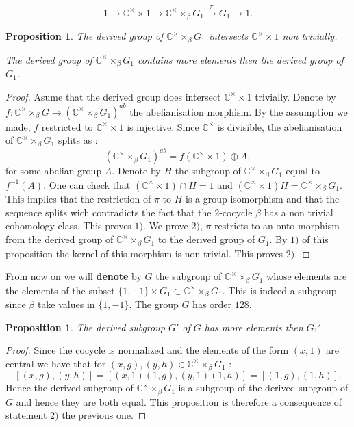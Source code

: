 \documentclass[12pt, reqno]{amsart}
\newtheorem{proposition}[theorem]{Proposition}
\begin{document}
$$1\to \mathbb{C}^\times\times 1 \to \mathbb{C}^\times \times_\beta G_1 \overset{\pi}{\to} G_1\to 1.$$
\begin{proposition}
\item[1)] The derived group of  $\mathbb{C}^\times \times_\beta G_1$ intersects $\mathbb{C}^\times \times 1$ non trivially. 
\item[2)] The derived group of $\mathbb{C}^\times \times_\beta G_1$ contains more elements then the derived group of $G_1$.
\end{proposition}
\begin{proof}
Asume that the derived group does intersect $\mathbb{C}^\times \times 1$ trivially. Denote by $f:  \mathbb{C}^\times \times_\beta G \to  (\mathbb{C}^\times \times_\beta G_1 )^{ab}$ the abelianisation morphism. By the assumption we made, $f$ restricted to $\mathbb{C}^\times \times 1$ is injective. Since $\mathbb{C}^\times$ is divisible, the abelianisation of $ \mathbb{C}^\times \times_\beta G_1 $ splits as :
$$( \mathbb{C}^\times \times_\beta G_1 )^{ab}=f(\mathbb{C}^\times \times 1 )\oplus A,$$
for some abelian group $A$. Denote by $H$ the subgroup of $ \mathbb{C}^\times \times_\beta G_1 $ equal to $f^{-1}(A)$. One can check that $(\mathbb{C}^\times \times 1)\cap H=1$ and $(\mathbb{C}^\times \times 1)H= \mathbb{C}^\times \times_\beta G_1 $. This implies that the restriction of $\pi$ to $H$ is a group isomorphism and that the sequence splits wich contradicts the fact that the $2$-cocycle $\beta$ has a non trivial cohomology class. This proves $1)$. We prove $2)$, $\pi$ restricts to an onto morphism from the derived group of $\mathbb{C}^\times \times_\beta G_1$ to the derived group of $G_1$. By $1)$ of this proposition the kernel of this morphism is non trivial. This proves $2)$. 
\end{proof}
From now on we will \textbf{denote} by $G$ the subgroup of $\mathbb{C}^\times \times_\beta G_1$ whose elements are the elements of the subset $\{1,-1\}\times G_1 \subset \mathbb{C}^\times \times_\beta G_1$. This is indeed a subgroup since $\beta$ take values in $\{1,-1\}$. The group $G$ has order $128$.
\begin{proposition}
The derived subgroup $G'$ of $G$ has more elements then $G_1'$.
\end{proposition}
 \begin{proof}
Since the cocycle is normalized and the elements of the form $(x,1)$ are central we have that for $(x,g),(y,h)\in \mathbb{C}^\times \times_\beta G_1$ :
$$[(x,g),(y,h)]=[(x,1)(1,g),(y,1)(1,h)]=[(1,g),(1,h)].$$
Hence the derived subgroup of $\mathbb{C}^\times \times_\beta G_1$ is a subgroup of the derived subgroup of $G$ and hence they are both equal. This proposition is therefore a consequence of statement $2)$ the previous one.
\end{proof}
\end{document}
